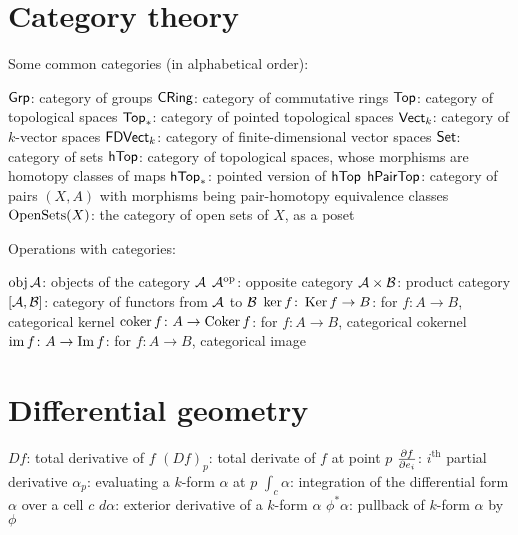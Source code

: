 \section{Category theory}
Some common categories (in alphabetical order):
\begin{itemize}
	\ii $\catname{Grp}$: category of groups
	\ii $\catname{CRing}$: category of commutative rings
	\ii $\catname{Top}$: category of topological spaces
	\ii $\catname{Top}_\ast$: category of pointed topological spaces
	\ii $\catname{Vect}_k$: category of $k$-vector spaces
	\ii $\catname{FDVect}_k$: category of finite-dimensional vector spaces
	\ii $\catname{Set}$: category of sets
	\ii $\catname{hTop}$: category of topological spaces,
	whose morphisms are homotopy classes of maps
	\ii $\catname{hTop}_\ast$: pointed version of $\catname{hTop}$
	\ii $\catname{hPairTop}$: category of pairs $(X,A)$ with morphisms
	being pair-homotopy equivalence classes
	\ii $\Opens(X)$: the category of open sets of $X$, as a poset
\end{itemize}
Operations with categories:
\begin{itemize}
	\ii $\obj \AA$: objects of the category $\AA$
	\ii $\AA\op$: opposite category
	\ii $\AA \times \BB$: product category
	\ii $[\AA, \BB]$: category of functors from $\AA$ to $\BB$
	\ii $\ker f \colon \Ker f \to B$: for $f \colon A \to B$, categorical kernel
	\ii $\coker f \colon A \to \Coker f$: for $f \colon A \to B$, categorical cokernel
	\ii $\img f \colon A \to \Img f$: for $f \colon A \to B$, categorical image
\end{itemize}

\section{Differential geometry}
\begin{itemize}
	\ii $Df$: total derivative of $f$
	\ii $(Df)_p$: total derivate of $f$ at point $p$
	\ii $\fpartial{f}{e_i}$: $i^{\text{th}}$ partial derivative
	\ii $\alpha_p$: evaluating a $k$-form $\alpha$ at $p$
	\ii $\int_c \alpha$: integration of the differential form $\alpha$ over a cell $c$
	\ii $d\alpha$: exterior derivative of a $k$-form $\alpha$
	\ii $\phi^\ast \alpha$: pullback of $k$-form $\alpha$ by $\phi$
\end{itemize}

